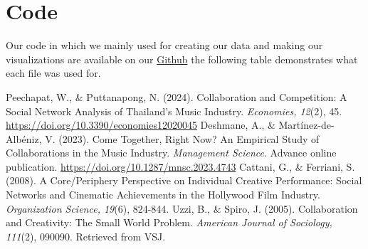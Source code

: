 \documentclass[12pt,a4paper]{article}
\begin{document}
\section{Code}
Our code in which we mainly used for creating our data and making our visualizations are available on our \href{https://github.com/Ty-Irving/CPSC-572-Project}{Github} the following 
table demonstrates what each file was used for. 
\begin{table}[H]
\centering
{}
\caption{Code file descriptions}
\label{tab:my-table}
\end{table}

\begin{thebibliography}{9}
Peechapat, W., \& Puttanapong, N. (2024). Collaboration and Competition: A Social Network Analysis of Thailand’s Music Industry. \textit{Economies, 12}(2), 45. \url{https://doi.org/10.3390/economies12020045}
Deshmane, A., \& Martínez-de-Albéniz, V. (2023). Come Together, Right Now? An Empirical Study of Collaborations in the Music Industry. \textit{Management Science}. Advance online publication. \url{https://doi.org/10.1287/mnsc.2023.4743}
Cattani, G., \& Ferriani, S. (2008). A Core/Periphery Perspective on Individual Creative Performance: Social Networks and Cinematic Achievements in the Hollywood Film Industry. \textit{Organization Science, 19}(6), 824-844.
Uzzi, B., \& Spiro, J. (2005). Collaboration and Creativity: The Small World Problem. \textit{American Journal of Sociology, 111}(2), 090090. Retrieved from VSJ.
\end{thebibliography}
\end{document}
